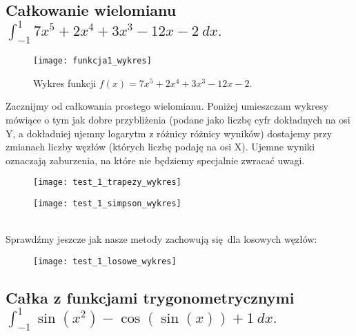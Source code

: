 \documentclass{article}
\begin{document}
\subsection{Całkowanie wielomianu $\int_{-1}^{1} 7x^5 + 2x^4 + 3x^3 - 12x - 2 \ dx.$}

\begin{figure}[h!]
\centering
\texttt{[image: funkcja1\_wykres]}
\caption{Wykres funkcji $f(x) = 7x^5+2x^4+3x^3-12x-2$.}	
\end{figure}


Zacznijmy od całkowania prostego wielomianu. Poniżej umieszczam wykresy mówiące o tym jak dobre przybliżenia (podane jako liczbę cyfr dokładnych na osi Y, a dokładniej ujemny logarytm z różnicy różnicy wyników) dostajemy przy zmianach liczby węzłów (których liczbę podaję na osi X). Ujemne wyniki oznaczają zaburzenia, na które nie będziemy specjalnie zwracać uwagi.

  \begin{minipage}{\linewidth}
      \centering
      \begin{minipage}{0.35\linewidth}
          \begin{figure}[H]
              \texttt{[image: test\_1\_trapezy\_wykres]}
          \end{figure}
      \end{minipage}
      \hspace{0.05\linewidth}
      \begin{minipage}{0.35\linewidth}
          \begin{figure}[H]
              \texttt{[image: test\_1\_simpson\_wykres]}
          \end{figure}
      \end{minipage}
  \end{minipage}\\

Sprawdźmy jeszcze jak nasze metody zachowują się dla losowych węzłów:

\begin{figure}[h!]
\centering
\texttt{[image: test\_1\_losowe\_wykres]}
\end{figure}

\pagebreak



\subsection{Całka z funkcjami trygonometrycznymi $\int_{-1}^{1} \sin(x^2) - \cos(\sin(x)) + 1 \ dx.$}
\end{document}

